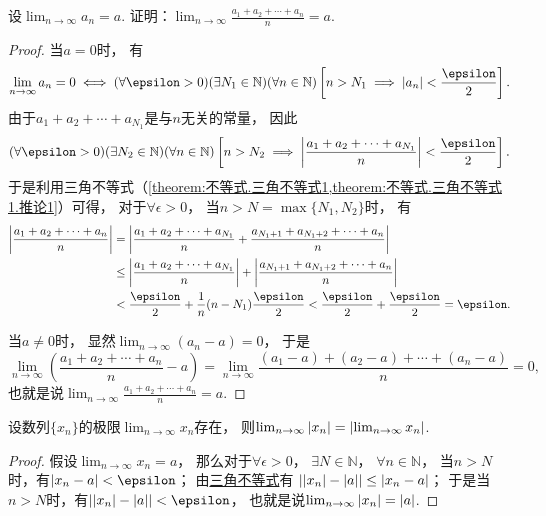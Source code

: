 \begin{example}
设\(\lim_{n\to\infty} a_n = a\).
证明：\(\lim_{n\to\infty} \frac{a_1+a_2+\dotsb+a_n}{n} = a\).
\begin{proof}
当\(a=0\)时，
有\[
	\lim_{n\to\infty} a_n = 0
	\iff
	(\forall\epsilon>0)
	(\exists N_1\in\mathbb{N})
	(\forall n\in\mathbb{N})
	\left[n>N_1 \implies \abs{a_n}<\frac\epsilon2\right].
\]
由于\(a_1 + a_2 + \dotsb + a_{N_1}\)是与\(n\)无关的常量，
因此\[
	(\forall\epsilon>0)
	(\exists N_2\in\mathbb{N})
	(\forall n\in\mathbb{N})
	\left[
		n>N_2
		\implies
		\abs{\frac{a_1 + a_2 + \dotsb + a_{N_1}}{n}} < \frac\epsilon2
	\right].
\]
于是利用三角不等式（\cref{theorem:不等式.三角不等式1,theorem:不等式.三角不等式1.推论1}）可得，
对于\(\forall\epsilon>0\)，
当\(n>N=\max\{N_1,N_2\}\)时，
有\begin{align*}
	\abs{\frac{a_1 + a_2 + \dotsb + a_n}{n}}
	&= \abs{
		\frac{a_1 + a_2 + \dotsb + a_{N_1}}{n}
		+ \frac{a_{N_1+1} + a_{N_1+2} + \dotsb + a_n}{n}
	} \\
	&\leq \abs{\frac{a_1 + a_2 + \dotsb + a_{N_1}}{n}}
	+ \abs{\frac{a_{N_1+1} + a_{N_1+2} + \dotsb + a_n}{n}} \\
	&< \frac\epsilon2 + \frac1n (n-N_1) \frac\epsilon2
	< \frac\epsilon2 + \frac\epsilon2
	= \epsilon.
\end{align*}

当\(a\neq0\)时，
显然\(\lim_{n\to\infty} (a_n - a) = 0\)，
于是\[
	\lim_{n\to\infty} \left(\frac{a_1+a_2+\dotsb+a_n}{n}-a\right)
	= \lim_{n\to\infty} \frac{(a_1-a)+(a_2-a)+\dotsb+(a_n-a)}{n}
	= 0,
\]
也就是说\(\lim_{n\to\infty} \frac{a_1+a_2+\dotsb+a_n}{n} = a\).
\end{proof}
\end{example}

\begin{proposition}\label{theorem:极限.数列的绝对值的极限}
设数列\(\{x_n\}\)的极限\(\lim_{n\to\infty} x_n\)存在，
则\(\lim_{n\to\infty} \abs{x_n} = \abs{\lim_{n\to\infty} x_n}\).
\begin{proof}
假设\(\lim_{n\to\infty} x_n = a\)，
那么对于\(\forall\epsilon>0\)，
\(\exists N\in\mathbb{N}\)，
\(\forall n\in\mathbb{N}\)，
当\(n>N\)时，有\(\abs{x_n - a} < \epsilon\)；
由\hyperref[theorem:不等式.三角不等式2]{三角不等式}有
\(\abs{\abs{x_n} - \abs{a}} \leq \abs{x_n - a}\)；
于是当\(n>N\)时，有\(\abs{\abs{x_n} - \abs{a}} < \epsilon\)，
也就是说\(\lim_{n\to\infty} \abs{x_n} = \abs{a}\).
\end{proof}
\end{proposition}

